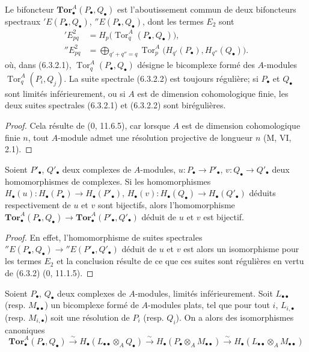 \begin{proposition}[6.3.2]
Le bifoncteur $\mathbf{Tor}_\bullet^A(P_\bullet,Q_\bullet)$ est
l'aboutissement commun de deux bifoncteurs spectraux
$'E(P_\bullet,Q_\bullet)$, $''E(P_\bullet,Q_\bullet)$, dont les termes $E_2$
sont
\begin{align}
  'E^2_{pq}
    &=H_p\bigl(\operatorname{Tor}_q^A(P_\bullet,Q_\bullet)\bigr),
    \tag{6.3.2.1}\label{III.6.3.2.1.fr}\\
  ''E^2_{pq}
    &=\bigoplus_{q'+q''=q}
      \operatorname{Tor}_p^A\bigl(H_{q'}(P_\bullet),H_{q''}(Q_\bullet)\bigr).
    \tag{6.3.2.2}\label{III.6.3.2.2.fr}
\end{align}
où, dans (6.3.2.1), $\operatorname{Tor}_q^A(P_\bullet,Q_\bullet)$ désigne le
bicomplexe formé des $A$-modules $\operatorname{Tor}_q^A(P_i,Q_j)$. La suite
spectrale (6.3.2.2) est toujours régulière; si $P_\bullet$ et $Q_\bullet$
sont limités inférieurement, ou si $A$ est de dimension cohomologique finie,
les deux suites spectrales (6.3.2.1) et (6.3.2.2) sont birégulières.
\end{proposition}

\begin{proof}
Cela résulte de (0, 11.6.5), car lorsque $A$ est de dimension cohomologique
finie $n$, tout $A$-module admet une résolution projective de longueur $n$
(M, VI, 2.1).
\end{proof}

\begin{corollary}[6.3.3]
Soient $P'_\bullet$, $Q'_\bullet$ deux complexes de $A$-modules,
$u:P_\bullet\to P'_\bullet$, $v:Q_\bullet\to Q'_\bullet$ deux homomorphismes
de complexes. Si les homomorphismes
$H_\bullet(u):H_\bullet(P_\bullet)\to H_\bullet(P'_\bullet)$,
$H_\bullet(v):H_\bullet(Q_\bullet)\to H_\bullet(Q'_\bullet)$ déduits
respectivement de $u$ et $v$ sont bijectifs, alors l'homomorphisme
$\mathbf{Tor}_\bullet^A(P_\bullet,Q_\bullet)\to
\mathbf{Tor}_\bullet^A(P'_\bullet,Q'_\bullet)$ déduit de $u$ et $v$ est
bijectif.
\end{corollary}

\begin{proof}
En effet, l'homomorphisme de suites spectrales
$''E(P_\bullet,Q_\bullet)\to''E(P'_\bullet,Q'_\bullet)$ déduit de $u$ et $v$
est alors un isomorphisme pour les termes $E_2$ et la conclusion résulte de
ce que ces suites sont régulières en vertu de (6.3.2) (0, 11.1.5).
\end{proof}

\begin{proposition}[6.3.4]
Soient $P_\bullet$, $Q_\bullet$ deux complexes de $A$-modules, limités
inférieurement. Soit $L_{\bullet\bullet}$ (resp. $M_{\bullet\bullet}$) un
bicomplexe formé de $A$-modules plats, tel que pour tout $i$,
$L_{i,\bullet}$ (resp. $M_{i,\bullet}$) soit une résolution de $P_i$
(resp. $Q_i$). On a alors des isomorphismes canoniques
\[
  \mathbf{Tor}_\bullet^A(P_\bullet,Q_\bullet)
  \xrightarrow{\sim}H_\bullet(L_{\bullet\bullet}\otimes_AQ_\bullet)
  \xrightarrow{\sim}H_\bullet(P_\bullet\otimes_AM_{\bullet\bullet})
  \xrightarrow{\sim}H_\bullet(L_{\bullet\bullet}\otimes_AM_{\bullet\bullet})
  \tag{6.3.4.1}\label{III.6.3.4.1.fr}
\]
\end{proposition}

